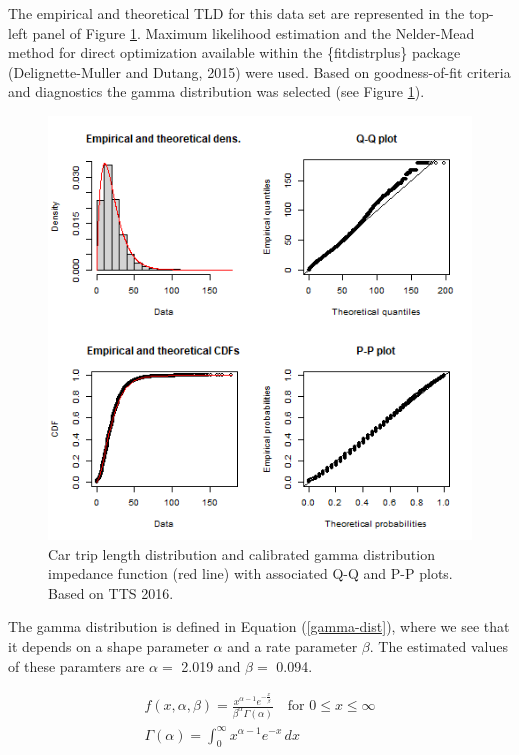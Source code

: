 \documentclass[]{elsarticle} %
\begin{document}
The empirical and theoretical TLD for this data set are represented in
the top-left panel of Figure \ref{fig:TLD-Gamma-plot}. Maximum
likelihood estimation and the Nelder-Mead method for direct optimization
available within the \{fitdistrplus\} package (Delignette-Muller and
Dutang, 2015) were used. Based on goodness-of-fit criteria and
diagnostics the gamma distribution was selected (see Figure
\ref{fig:TLD-Gamma-plot}).

\begin{figure}

{\centering \includegraphics[width=0.8\linewidth]{images/impedance_function} 

}

\caption{\label{fig:TLD-Gamma-plot}Car trip length distribution and calibrated gamma distribution impedance function (red line) with associated Q-Q and P-P plots. Based on TTS 2016.}\label{fig:TLD-Gamma-plot}
\end{figure}

The gamma distribution is defined in Equation (\ref{gamma-dist}), where
we see that it depends on a shape parameter \(\alpha\) and a rate
parameter \(\beta\). The estimated values of these paramters are
\(\alpha=\) 2.019 and \(\beta =\) 0.094.

\begin{equation}
\label{gamma-dist}
\begin{array}{l} 
f(x, \alpha, \beta) = \frac {x^{\alpha-1}e^{-\frac{x}{\beta}}}{ \beta^{\alpha}\Gamma(\alpha)} \quad \text{for } 0 \leq x \leq \infty\\

\Gamma(\alpha) =  \int_{0}^{\infty} x^{\alpha-1}e^{-x} \,dx\\
\end{array}
\end{equation}
\end{document}
